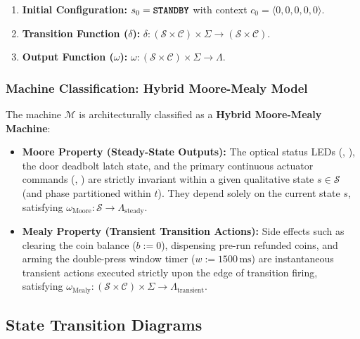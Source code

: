 \begin{enumerate}[leftmargin=*]
        \begin{equation}
          \Lambda = \Lambda_{\text{RLED}} \times \Lambda_{\text{BLED}} \times \Lambda_{\text{motor}} \times \Lambda_{\text{pump}} \times \Lambda_{\text{door}} \times \Lambda_{\text{return}}
        \end{equation}
  \item \textbf{Initial Configuration:} $s_0 = \text{\texttt{\textbf{STANDBY}}}$ with context $c_0 = \langle 0, 0, 0, 0, 0 \rangle$.
  \item \textbf{Transition Function ($\delta$):} $\delta: (\mathcal{S} \times \mathcal{C}) \times \Sigma \to (\mathcal{S} \times \mathcal{C})$.
  \item \textbf{Output Function ($\omega$):} $\omega: (\mathcal{S} \times \mathcal{C}) \times \Sigma \to \Lambda$.
\end{enumerate}

\subsubsection{Machine Classification: Hybrid Moore-Mealy Model}

The machine $\mathcal{M}$ is architecturally classified as a \textbf{Hybrid Moore-Mealy Machine}:
\begin{itemize}
  \item \textbf{Moore Property (Steady-State Outputs):} The optical status LEDs (, ),
        the door deadbolt latch state, and the primary continuous actuator commands (, )
        are strictly invariant within a given qualitative state $s \in \mathcal{S}$ (and phase partitioned within $t$).
        They depend solely on the current state $s$, satisfying $\omega_{\text{Moore}}: \mathcal{S} \to \Lambda_{\text{steady}}$.
  \item \textbf{Mealy Property (Transient Transition Actions):} Side effects such as clearing the coin balance
        ($b := 0$), dispensing pre-run refunded coins, and arming the double-press window timer
        ($w := 1500\,\text{ms}$) are instantaneous transient actions executed strictly upon the edge of transition
        firing, satisfying $\omega_{\text{Mealy}}: (\mathcal{S} \times \mathcal{C}) \times \Sigma \to \Lambda_{\text{transient}}$.
\end{itemize}

\subsection{State Transition Diagrams}

